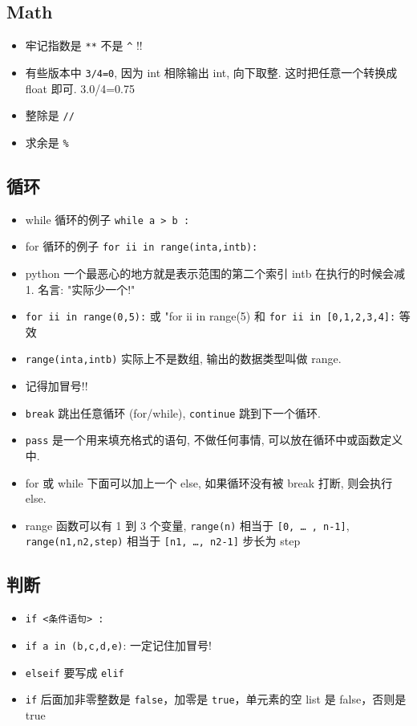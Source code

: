 \subsection{Math}
\begin{itemize}
\item 牢记指数是 \verb`**` 不是 \verb`^` !!
\item 有些版本中 \verb`3/4=0`, 因为 int 相除输出 int, 向下取整. 这时把任意一个转换成float 即可. 3.0/4=0.75
\item 整除是 \verb`//`
\item 求余是 \verb`%`
\end{itemize}

\subsection{循环}
\begin{itemize}
\item while 循环的例子  \verb`while a > b :`
\item for 循环的例子 \verb`for ii in range(inta,intb):`
\item python 一个最恶心的地方就是表示范围的第二个索引 intb 在执行的时候会减 1.  名言: "实际少一个!"
\item \verb`for ii in range(0,5):` 或 "for ii in range(5) 和 \verb`for ii in [0,1,2,3,4]:` 等效
\item \verb`range(inta,intb)` 实际上不是数组, 输出的数据类型叫做 range.
\item 记得加冒号!!
\item \verb`break` 跳出任意循环 (for/while), \verb`continue` 跳到下一个循环.
\item \verb`pass` 是一个用来填充格式的语句, 不做任何事情, 可以放在循环中或函数定义中.
\item for 或 while 下面可以加上一个 else, 如果循环没有被 break 打断, 则会执行 else.
\item range 函数可以有 1 到 3 个变量, \verb`range(n)` 相当于 \verb`[0, … , n-1]`, \verb`range(n1,n2,step)` 相当于 \verb`[n1, …, n2-1]` 步长为 step 
\end{itemize}

\subsection{判断}
\begin{itemize}
\item \verb`if <条件语句> :`
\item \verb`if a in (b,c,d,e)`:   一定记住加冒号!
\item \verb`elseif` 要写成 \verb`elif`
\item \verb`if` 后面加非零整数是 \verb`false`，加零是 \verb`true`，单元素的空 list 是 false，否则是 true
\end{itemize}

